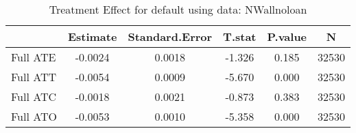 \begin{table}[ht]
\centering
\caption{Treatment Effect for default using data: NWallnoloan} 
\label{tab:NWallnoloan_TE}
\begingroup\footnotesize
\begin{tabular}{lccccc}
  \hline
 & Estimate & Standard.Error & T.stat & P.value & N \\ 
  \hline
Full ATE & -0.0024 & 0.0018 & -1.326 & 0.185 & 32530 \\ 
  Full ATT & -0.0054 & 0.0009 & -5.670 & 0.000 & 32530 \\ 
  Full ATC & -0.0018 & 0.0021 & -0.873 & 0.383 & 32530 \\ 
  Full ATO & -0.0053 & 0.0010 & -5.358 & 0.000 & 32530 \\ 
   \hline
\end{tabular}
\endgroup
\end{table}
